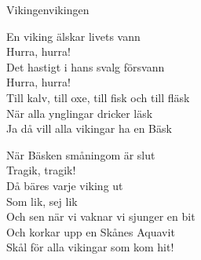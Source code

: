 \begin{song}{Vikingen}{vikingen}
\begin{vers}
En viking älskar livets vann\\
Hurra, hurra!\\
Det hastigt i hans svalg försvann\\
Hurra, hurra!\\
Till kalv, till oxe, till fisk och till fläsk\\
När alla ynglingar dricker läsk\\
Ja då vill alla vikingar ha en Bäsk\\
\end{vers}
\begin{vers}
När Bäsken småningom är slut\\
Tragik, tragik!\\
Då bäres varje viking ut\\
Som lik, sej lik\\
Och sen när vi vaknar vi sjunger en bit\\
Och korkar upp en Skånes Aquavit\\
\repopen Skål för alla vikingar som kom hit! \repclose\\
\end{vers}
\end{song}
